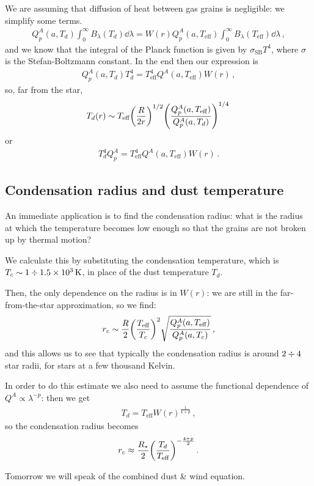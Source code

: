 \documentclass[main.tex]{subfiles}
\begin{document}
We are assuming that diffusion of heat between gas grains is negligible: we simplify some terms. 
%
\begin{align}
  Q_p^{A} (a, T_d ) \int_{0}^{ \infty } B_\lambda(T_d) \dd{\lambda }
  = W(r) Q_p^{A} (a, T _{\text{eff}}) \int_{0}^{ \infty }
  B_\lambda (T _{\text{eff}}) \dd{\lambda }
\,,
\end{align}
%
and we know that the integral of the Planck function is given by \(\sigma _{\text{SB}} T^{4}\), where \(\sigma \) is the Stefan-Boltzmann constant. In the end then our expression is 
%
\begin{align}
  Q_p^{A} (a, T_d) T_d^{4} = T^{4} _{\text{eff}} Q^{A}(a, T _{\text{eff}}) W(r)
\,,
\end{align}
%
so, far from the star,
%
\begin{align}
  T_d(r) \sim T _{\text{eff}} \qty(\frac{R}{2r})^{1/2} \qty(\frac{Q^{A}_{p} (a, T _{\text{eff}})}{Q^{A}_{p} (a,T_{d})})^{1/4}
\,
\end{align}
%
or 
%
\begin{align}
T_d^{4} Q_p^{A} = T _{\text{eff}}^{4} Q^{A} (a, T _{\text{eff}}) W(r)
\,.
\end{align}
%

\subsection{Condensation radius and dust temperature}

An immediate application is to find the condensation radius: what is the radius at which the temperature becomes low enough so that the grains are not broken up by thermal motion? 

We calculate this by substituting the condensation temperature, which is \(T_c \sim 1 \divisionsymbol  \SI{1.5e3}{K} \), in place of the dust temperature \(T_d\).

Then, the only dependence on the radius is in \(W(r)\): we are still in the far-from-the-star approximation, so we find:
%
\begin{align}
r_c \sim \frac{R}{2} \qty(\frac{T _{\text{eff}}}{T_c})^2
\sqrt{\frac{Q^{A}_p (a, T _{\text{eff}})}{Q^{A}_p (a,  T_c)}}
\,,
\end{align}
%
and this allows us to see that typically the condensation radius is around \(2 \divisionsymbol 4\) star radii, for stars at a few thousand Kelvin.

In order to do this estimate we also need to assume the functional dependence of \(Q^{A} \propto \lambda^{-p}\): then we get 
%
\begin{align}
T_d = T _{\text{eff}} W(r)^{\frac{1}{4+p}}
\,,
\end{align}
%
so the condensation radius becomes 
%
\begin{align}
r_c \approx \frac{R_*}{2} \qty(\frac{T_d}{T _{\text{eff}}})^{- \frac{4 + p}{2}}
\,.
\end{align}

Tomorrow we will speak of the combined dust \& wind equation. 
\end{document}
